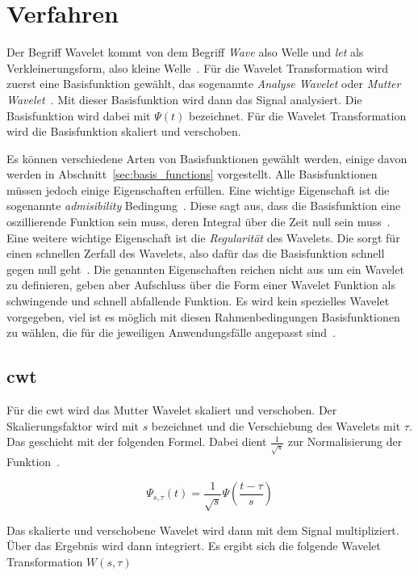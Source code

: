 \documentclass[12pt, a4paper, ngerman]{article}
\begin{document}
\section{Verfahren}

Der Begriff Wavelet kommt von dem Begriff \emph{Wave} also Welle
und \emph{let} als Verkleinerungsform, also kleine Welle~\cite[S.2]{wavelet_patterns}.
Für die Wavelet Transformation wird zuerst eine Basisfunktion gewählt,
das sogenannte \emph{Analyse Wavelet} oder \emph{Mutter Wavelet}~\cite{wavelets_intro}.
Mit dieser Basisfunktion wird dann das Signal analysiert.
Die Basisfunktion wird dabei mit \(\Psi(t)\) bezeichnet.
Für die Wavelet Transformation wird die Basisfunktion skaliert und verschoben.

Es können verschiedene Arten von Basisfunktionen gewählt werden,
einige davon werden in Abschnitt~\ref{sec:basis_functions} vorgestellt.
Alle Basisfunktionen müssen jedoch einige Eigenschaften erfüllen.
Eine wichtige Eigenschaft ist die sogenannte \emph{admisibility} Bedingung~\cite[S.6]{friendly_wavelet}.
Diese sagt aus, dass die Basisfunktion eine oszillierende Funktion sein muss,
deren Integral über die Zeit null sein muss~\cite[S.6]{friendly_wavelet}.
Eine weitere wichtige Eigenschaft ist die \emph{Regularität} des Wavelets.
Die sorgt für einen schnellen Zerfall des Wavelets,
also dafür das die Basisfunktion schnell gegen null geht~\cite[S.6]{friendly_wavelet}.
Die genannten Eigenschaften reichen nicht aus um ein Wavelet zu definieren,
geben aber Aufschluss über die Form einer Wavelet Funktion
als schwingende und schnell abfallende Funktion.
Es wird kein spezielles Wavelet vorgegeben,
viel ist es möglich mit diesen Rahmenbedingungen Basisfunktionen zu wählen,
die für die jeweiligen Anwendungsfälle angepasst sind~\cite[S.5]{friendly_wavelet}.

\subsection{\acl{cwt}}

Für die \ac{cwt} wird das Mutter Wavelet skaliert und verschoben.
Der Skalierungsfaktor wird mit \(s\) bezeichnet
und die Verschiebung des Wavelets mit \(\tau\).
Das geschieht mit der folgenden Formel.
Dabei dient \(\frac{1}{\sqrt{s}}\) zur Normalisierung der Funktion~\cite[S.5]{friendly_wavelet}.

\[
  \Psi_{s,\tau}(t)=\frac{1}{\sqrt{s}}\Psi(\frac{t-\tau}{s})
\]

Das skalierte und verschobene Wavelet wird dann mit dem Signal multipliziert.
Über das Ergebnis wird dann integriert.
Es ergibt sich die folgende Wavelet Transformation \(W(s,\tau)\)~\cite[S.5]{friendly_wavelet}
\end{document}
